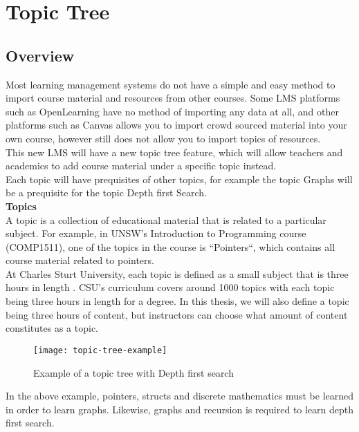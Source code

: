 \section{Topic Tree}
\subsection{Overview}
Most learning management systems do not have a simple and easy method to import course material and resources from other courses. Some LMS platforms such as OpenLearning have no method of importing any data at all, and other platforms such as Canvas allows you to import crowd sourced material into your own course, however still does not allow you to import topics of resources. \\

This new LMS will have a new topic tree feature, which will allow teachers and academics to add course material under a specific topic instead.\\
Each topic will have prequisites of other topics, for example the topic Graphs will be a prequisite for the topic Depth first Search.\\

\textbf{Topics} \\
A topic is a collection of educational material that is related to a particular subject. For example, in UNSW's Introduction to Programming course (COMP1511), one of the topics in the course is ``Pointers``, which contains all course material related to pointers.\\

At Charles Sturt University, each topic is defined as a small subject that is three hours in length \cite{csutopictree}. CSU's curriculum covers around 1000 topics with each topic being three hours in length for a degree. In this thesis, we will also define a topic being three hours of content, but instructors can choose what amount of content constitutes as a topic.\\


\begin{figure}[h!]
    \centering
    \texttt{[image: topic-tree-example]}
    \caption{Example of a topic tree with Depth first search}
\end{figure}

In the above example, pointers, structs and discrete mathematics must be learned in order to learn graphs. Likewise, graphs and recursion is required to learn depth first search.\\


